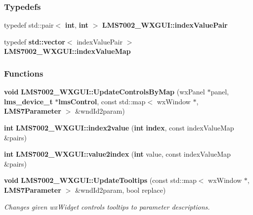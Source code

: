 \subsubsection*{Typedefs}
\begin{DoxyCompactItemize}
\item 
typedef std\+::pair$<$ {\bf int}, {\bf int} $>$ {\bf L\+M\+S7002\+\_\+\+W\+X\+G\+U\+I\+::index\+Value\+Pair}
\item 
typedef {\bf std\+::vector}$<$ index\+Value\+Pair $>$ {\bf L\+M\+S7002\+\_\+\+W\+X\+G\+U\+I\+::index\+Value\+Map}
\end{DoxyCompactItemize}
\subsubsection*{Functions}
\begin{DoxyCompactItemize}
\item 
{\bf void} {\bf L\+M\+S7002\+\_\+\+W\+X\+G\+U\+I\+::\+Update\+Controls\+By\+Map} (wx\+Panel $\ast$panel, {\bf lms\+\_\+device\+\_\+t} $\ast${\bf lms\+Control}, const std\+::map$<$ wx\+Window $\ast$, {\bf L\+M\+S7\+Parameter} $>$ \&wnd\+Id2param)
\item 
{\bf int} {\bf L\+M\+S7002\+\_\+\+W\+X\+G\+U\+I\+::index2value} ({\bf int} {\bf index}, const index\+Value\+Map \&pairs)
\item 
{\bf int} {\bf L\+M\+S7002\+\_\+\+W\+X\+G\+U\+I\+::value2index} ({\bf int} value, const index\+Value\+Map \&pairs)
\item 
{\bf void} {\bf L\+M\+S7002\+\_\+\+W\+X\+G\+U\+I\+::\+Update\+Tooltips} (const std\+::map$<$ wx\+Window $\ast$, {\bf L\+M\+S7\+Parameter} $>$ \&wnd\+Id2param, bool replace)
\begin{DoxyCompactList}\small\item\em Changes given wx\+Widget controls tooltips to parameter descriptions. \end{DoxyCompactList}\end{DoxyCompactItemize}
